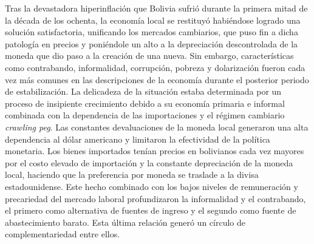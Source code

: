 \documentclass[12pt,letterpaper]{article}
\begin{document}

Tras la devastadora hiperinflación que Bolivia sufrió durante la primera mitad de la década de los ochenta, la economía local se restituyó habiéndose logrado una solución satisfactoria, unificando los mercados cambiarios, que puso fin a dicha patología en precios y poniéndole un alto a la depreciación descontrolada de la moneda que dio paso a la creación de una nueva. Sin embargo, características como contrabando, informalidad, corrupción, pobreza y dolarización fueron cada vez más comunes en las descripciones de la economía durante el posterior periodo de estabilización. La delicadeza de la situación estaba determinada por un proceso de insipiente crecimiento debido a su economía primaria e informal combinada con la dependencia de las importaciones y el régimen cambiario \emph{crawling peg}. Las constantes devaluaciones de la moneda local generaron una alta dependencia al dólar americano y limitaron la efectividad de la política monetaria. Los bienes importados tenían precios en bolivianos cada vez mayores por el costo elevado de importación y la constante depreciación de la moneda local, haciendo que la preferencia por moneda se traslade a la divisa estadounidense. Este hecho combinado con los bajos niveles de remuneración y precariedad del mercado laboral profundizaron la informalidad y el contrabando, el primero como alternativa de fuentes de ingreso y el segundo como fuente de abastecimiento barato. Esta última relación generó un círculo de complementariedad entre ellos. 
\end{document}
